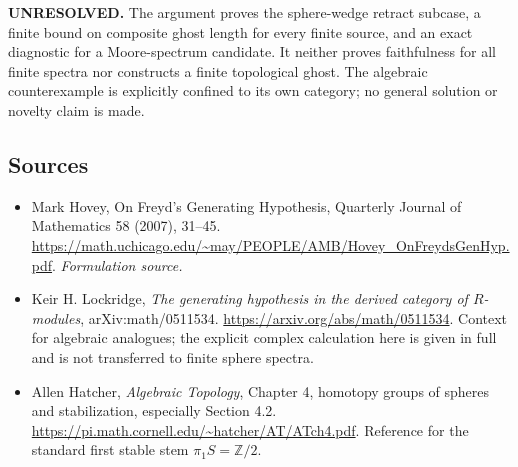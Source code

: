 \documentclass[11pt]{article}
\begin{document}
\textbf{UNRESOLVED.} The argument proves the sphere-wedge retract subcase,
a finite bound on composite ghost length for every finite source, and
an exact diagnostic for a Moore-spectrum candidate. It neither proves
faithfulness for all finite spectra nor constructs a finite topological
ghost. The algebraic counterexample is explicitly confined to its own
category; no general solution or novelty claim is made.

\subsection{Sources}
\begin{itemize}
\item[S1]Mark Hovey, On Freyd's Generating Hypothesis, Quarterly Journal of Mathematics 58 (2007), 31–45.
\url{https://math.uchicago.edu/~may/PEOPLE/AMB/Hovey_OnFreydsGenHyp.pdf}.
\textit{Formulation source.}
\item[E1]Keir H. Lockridge, \textit{The generating hypothesis in the
derived category of $R$-modules}, arXiv:math/0511534.
\url{https://arxiv.org/abs/math/0511534}.
Context for algebraic analogues; the explicit complex calculation here
is given in full and is not transferred to finite sphere spectra.
\item[E2]Allen Hatcher, \textit{Algebraic Topology}, Chapter 4,
homotopy groups of spheres and stabilization, especially Section 4.2.
\url{https://pi.math.cornell.edu/~hatcher/AT/ATch4.pdf}.
Reference for the standard first stable stem $\pi_1S=\mathbb Z/2$.
\end{itemize}
\end{document}
